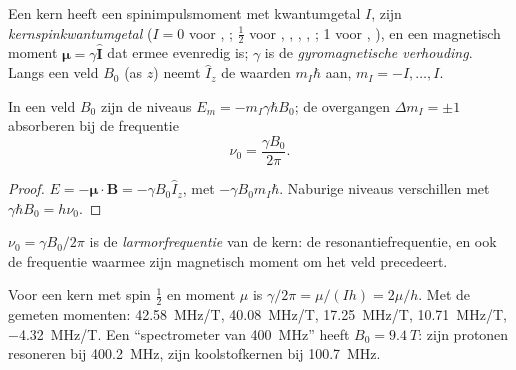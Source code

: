 \begin{definition}\label{def:b3:advanced-nmr:nuclear-spin}
Een kern heeft een spinimpulsmoment met kwantumgetal $I$, zijn
\emph{kernspinkwantumgetal} ($I = 0$
voor , ; $\frac12$ voor , , , ,
; 1 voor , ), en een magnetisch moment $\boldsymbol\mu = \gamma\hat{\mathbf
I}$ dat ermee evenredig is; $\gamma$ is de
\emph{gyromagnetische verhouding}.
Langs een veld $B_0$ (as $z$) neemt $\hat I_z$ de waarden $m_I\hbar$ aan,
$m_I = -I, \dots, I$.
\end{definition}

\begin{proposition}[Zeemanniveaus]\label{prop:b3:advanced-nmr:zeeman}
In een veld $B_0$ zijn de niveaus $E_m = -m_I\gamma\hbar B_0$; de overgangen $\Delta m_I = \pm1$
absorberen bij de frequentie
\[
\nu_0 = \frac{\gamma B_0}{2\pi}.
\]
\end{proposition}

\begin{proof}
$E = -\boldsymbol\mu\cdot\mathbf B = -\gamma B_0\hat I_z$, met  $-\gamma B_0m_I\hbar$. Naburige
niveaus verschillen met $\gamma\hbar B_0 = h\nu_0$.
\end{proof}

\begin{definition}[Larmorfrequentie]\label{def:b3:advanced-nmr:larmor}
$\nu_0 = \gamma B_0/2\pi$ is de \emph{larmorfrequentie} van de
kern: de resonantiefrequentie, en ook de frequentie waarmee zijn
magnetisch moment om het veld precedeert.
\end{definition}

\begin{example}\label{ex:b3:advanced-nmr:nuclei}
Voor een kern met spin $\frac12$ en moment $\mu$ is $\gamma/2\pi = \mu/(Ih) = 2\mu/h$. Met de
gemeten momenten:  \qty{42.58}{MHz/T},  \qty{40.08}{MHz/T}, 
\qty{17.25}{MHz/T},  \qty{10.71}{MHz/T},  \qty{-4.32}{MHz/T}. Een
``spectrometer van \qty{400}{MHz}'' heeft $B_0 = \qty{9.4}{T}$: zijn protonen
resoneren bij
\qty{400.2}{MHz}, zijn koolstofkernen bij \qty{100.7}{MHz}.
\end{example}

